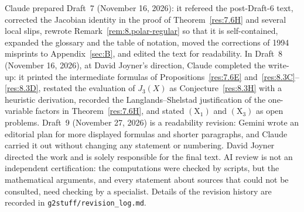 \documentclass[12pt,letterpaper]{amsart}
\theoremstyle{plain}
\theoremstyle{definition}
\theoremstyle{remark}
\theoremstyle{definition}
\begin{document}
Claude prepared Draft~7
(November 16, 2026): it refereed the post-Draft-6 text, corrected the Jacobian
identity in the proof of Theorem~\ref{res:7.6H} and several local slips,
rewrote Remark~\ref{rem:8.polar-regular} so that it is self-contained, expanded
the glossary and the table of notation, moved the corrections of 1994
misprints to Appendix~\ref{sec:B}, and edited the text for readability. In
Draft~8 (November 16, 2026), at David Joyner's direction, Claude completed the
write-up: it printed the intermediate formulas of Propositions~\ref{res:7.6E}
and~\ref{res:8.3C}--\ref{res:8.3D}, restated the evaluation of $J_3(X)$ as
Conjecture~\ref{res:8.3H} with a heuristic derivation, recorded the
Langlands--Shelstad justification of the one-variable factors in
Theorem~\ref{res:7.6H}, and stated $(\mathrm X_1)$ and $(\mathrm X_3)$ as open
problems. Draft~9 (November 27, 2026) is a readability revision: Gemini
wrote an editorial plan for more displayed formulas and shorter paragraphs,
and Claude carried it out without changing any statement or numbering.
David Joyner directed the work and is solely
responsible for the final text. AI review is not an independent
certification: the computations were checked by scripts, but the
mathematical arguments, and every statement about sources that could not be
consulted, need checking by a specialist. Details of the revision history are recorded in
\texttt{g2stuff/revision\_log.md}.
\end{document}
